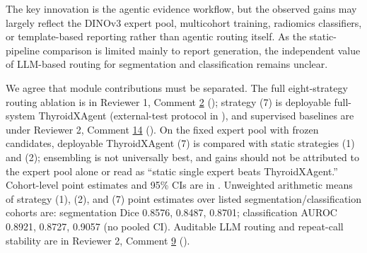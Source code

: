 \label{rev:R2.8}
\begin{reviewercomment}
The key innovation is the agentic evidence workflow, but the observed gains may largely reflect the DINOv3 expert pool, multicohort training, radiomics classifiers, or template-based reporting rather than agentic routing itself. As the static-pipeline comparison is limited mainly to report generation, the independent value of LLM-based routing for segmentation and classification remains unclear.
\end{reviewercomment}
\begin{authorresponse}
We agree that module contributions must be separated. The full eight-strategy routing ablation is in Reviewer 1, Comment \hyperref[rev:R1.2]{2} (); strategy (7) is deployable full-system ThyroidXAgent (external-test protocol in ), and supervised baselines are under Reviewer 2, Comment \hyperref[rev:R2.14]{14} (). On the fixed expert pool with frozen candidates, deployable ThyroidXAgent (7) is compared with static strategies (1) and (2); ensembling is not universally best, and gains should not be attributed to the expert pool alone or read as ``static single expert beats ThyroidXAgent.'' Cohort-level point estimates and 95\% CIs are in . Unweighted arithmetic means of strategy (1), (2), and (7) point estimates over listed segmentation/classification cohorts are: segmentation Dice 0.8576, 0.8487, 0.8701; classification AUROC 0.8921, 0.8727, 0.9057 (no pooled CI). Auditable LLM routing and repeat-call stability are in Reviewer 2, Comment \hyperref[rev:R2.9]{9} ().
\par
\end{authorresponse}




